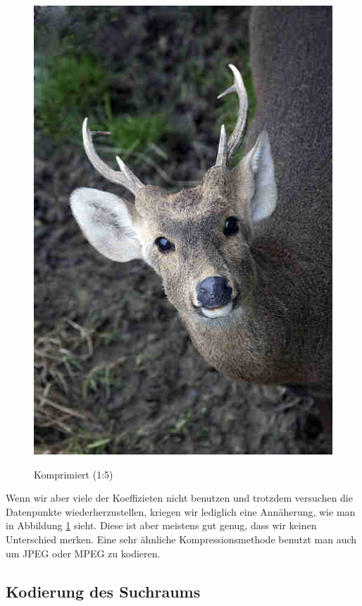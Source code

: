 \begin{multicols}{2}
\begin{figure}[H]
\begin{center}
                    \includegraphics[scale=0.239]{../pictures/gazelle-compressed.jpg}\\
                    \caption{Komprimiert (1:5)}\label{fig:gazelle-compressed}
                \end{center}
            \end{figure}
        \end{multicols}

        \noindent
        Wenn wir aber viele der Koeffizieten nicht benutzen und trotzdem versuchen die Datenpunkte wiederherzustellen, kriegen wir lediglich eine Annäherung, wie man in Abbildung \ref{fig:gazelle-compressed} sieht. Diese ist aber meistens gut genug, dass wir keinen Unterschied merken. Eine sehr ähnliche Kompressionsmethode benutzt man auch um JPEG oder MPEG zu kodieren.

        \subsection{Kodierung des Suchraums}

